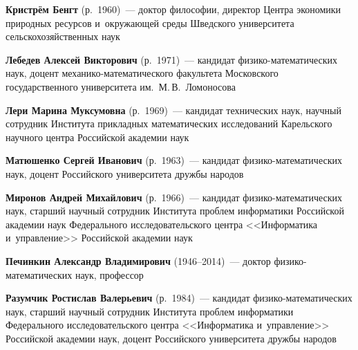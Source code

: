 \begin{multicols}{2}
 \vspace*{2pt}
 
 \noindent
 \textbf{Кристрём Бенгт} (р.\ 1960)~--- доктор философии, директор
 Центра экономики природных ресурсов и~окружающей среды Шведского 
 университета сельскохозяйственных наук
 
 \vspace*{2pt}

\noindent
\textbf{Лебедев Алексей Викторович} (р.\ 1971)~---
кандидат фи\-зи\-ко-ма\-те\-ма\-ти\-че\-ских наук,
доцент ме\-ха\-ни\-ко-ма\-те\-ма\-ти\-че\-ско\-го факультета
Московского государственного университета им.\ М.\,В.~Ломоносова



\columnbreak

\noindent
\textbf{Лери Марина Муксумовна} (р.\ 1969)~---
  кандидат технических наук, научный сотрудник
  Института прикладных математических исследований Карельского научного
  центра Российской академии наук

   \vspace*{3pt}
   
   \noindent
  \textbf{Матюшенко Сергей Иванович} (р.\ 1963)~---
  кандидат фи\-зи\-ко-ма\-те\-ма\-ти\-че\-ских наук,  
  доцент Российского университета дружбы народов 


\vspace*{3pt}

\noindent
\textbf{Миронов Андрей Михайлович} (р.\ 1966)~---
кандидат фи\-зи\-ко-ма\-те\-ма\-ти\-че\-ских наук, старший научный сотрудник
Института проб\-лем информатики Российской академии наук Федерального
исследовательского центра <<Информатика и~управ\-ле\-ние>>
Российской академии наук


 \vspace*{3pt}
 
 \noindent
\textbf{Печинкин Александр Владимирович} (1946--2014)~---
доктор фи\-зи\-ко-ма\-те\-ма\-ти\-че\-ских наук, профессор

\vspace*{3pt}
 
 \noindent
\textbf{Разумчик Ростислав Валерьевич} (р.\ 1984)~---
кандидат фи\-зи\-ко-ма\-те\-ма\-ти\-че\-ских наук,
старший научный сотрудник Института проблем 
информатики Федерального исследовательского центра <<Информатика и~управ\-ление>> 
Российской академии наук, доцент
Российского университета дружбы народов

\vspace*{3pt}


\end{multicols}
